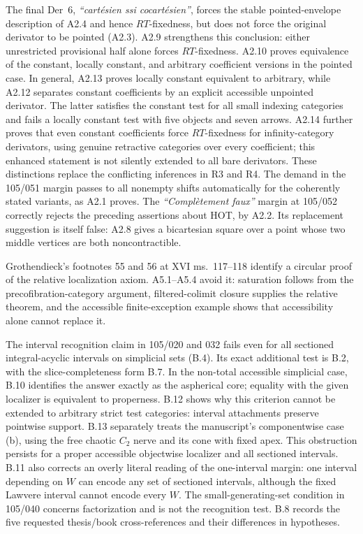 The final Der~6, \emph{``cart\'esien ssi cocart\'esien''}, forces the stable pointed-envelope description of A2.4 and hence $RT$-fixedness, but does not force the original derivator to be pointed (A2.3). A2.9 strengthens this conclusion: either unrestricted provisional half alone forces $RT$-fixedness. A2.10 proves equivalence of the constant, locally constant, and arbitrary coefficient versions in the pointed case. In general, A2.13 proves locally constant equivalent to arbitrary, while A2.12 separates constant coefficients by an explicit accessible unpointed derivator. The latter satisfies the constant test for all small indexing categories and fails a locally constant test with five objects and seven arrows. A2.14 further proves that even constant coefficients force $RT$-fixedness for infinity-category derivators, using genuine retractive categories over every coefficient; this enhanced statement is not silently extended to all bare derivators. These distinctions replace the conflicting inferences in R3 and R4. The demand in the 105/051 margin passes to all nonempty shifts automatically for the coherently stated variants, as A2.1 proves. The \emph{``Compl\`etement faux''} margin at 105/052 correctly rejects the preceding assertions about HOT, by A2.2. Its replacement suggestion is itself false: A2.8 gives a bicartesian square over a point whose two middle vertices are both noncontractible.

Grothendieck's footnotes 55 and 56 at XVI ms.~117--118 identify a circular proof of the relative localization axiom. A5.1--A5.4 avoid it: saturation follows from the precofibration-category argument, filtered-colimit closure supplies the relative theorem, and the accessible finite-exception example shows that accessibility alone cannot replace it.

The interval recognition claim in 105/020 and 032 fails even for all sectioned integral-acyclic intervals on simplicial sets (B.4). Its exact additional test is B.2, with the slice-completeness form B.7. In the non-total accessible simplicial case, B.10 identifies the answer exactly as the aspherical core; equality with the given localizer is equivalent to properness. B.12 shows why this criterion cannot be extended to arbitrary strict test categories: interval attachments preserve pointwise support. B.13 separately treats the manuscript's componentwise case (b), using the free chaotic $C_2$ nerve and its cone with fixed apex. This obstruction persists for a proper accessible objectwise localizer and all sectioned intervals. B.11 also corrects an overly literal reading of the one-interval margin: one interval depending on $W$ can encode any set of sectioned intervals, although the fixed Lawvere interval cannot encode every $W$. The small-generating-set condition in 105/040 concerns factorization and is not the recognition test. B.8 records the five requested thesis/book cross-references and their differences in hypotheses.

